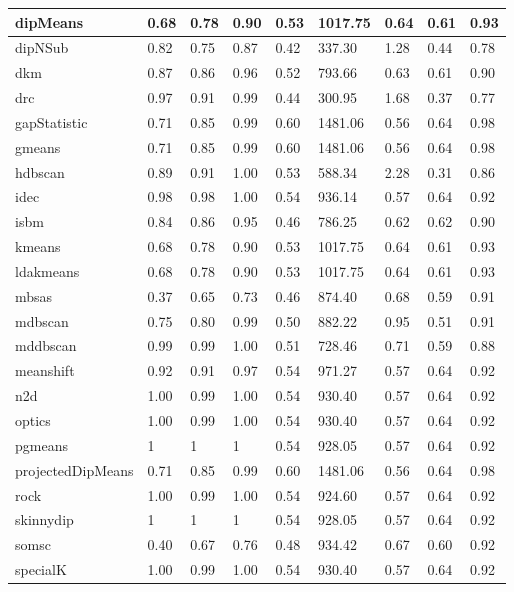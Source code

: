 \begin{table}[H]
\begin{tabular}{|l|l|l|l|l|l|l|l|l|}
\hline
dipMeans & 0.68 & 0.78 & 0.90 & 0.53 & 1017.75 & 0.64 & 0.61 & 0.93 \\
\hline
dipNSub & 0.82 & 0.75 & 0.87 & 0.42 & 337.30 & 1.28 & 0.44 & 0.78 \\
\hline
dkm & 0.87 & 0.86 & 0.96 & 0.52 & 793.66 & 0.63 & 0.61 & 0.90 \\
\hline
drc & 0.97 & 0.91 & 0.99 & 0.44 & 300.95 & 1.68 & 0.37 & 0.77 \\
\hline
gapStatistic & 0.71 & 0.85 & 0.99 & 0.60 & 1481.06 & 0.56 & 0.64 & 0.98 \\
\hline
gmeans & 0.71 & 0.85 & 0.99 & 0.60 & 1481.06 & 0.56 & 0.64 & 0.98 \\
\hline
hdbscan & 0.89 & 0.91 & 1.00 & 0.53 & 588.34 & 2.28 & 0.31 & 0.86 \\
\hline
idec & 0.98 & 0.98 & 1.00 & 0.54 & 936.14 & 0.57 & 0.64 & 0.92 \\
\hline
isbm & 0.84 & 0.86 & 0.95 & 0.46 & 786.25 & 0.62 & 0.62 & 0.90 \\
\hline
kmeans & 0.68 & 0.78 & 0.90 & 0.53 & 1017.75 & 0.64 & 0.61 & 0.93 \\
\hline
ldakmeans & 0.68 & 0.78 & 0.90 & 0.53 & 1017.75 & 0.64 & 0.61 & 0.93 \\
\hline
mbsas & 0.37 & 0.65 & 0.73 & 0.46 & 874.40 & 0.68 & 0.59 & 0.91 \\
\hline
mdbscan & 0.75 & 0.80 & 0.99 & 0.50 & 882.22 & 0.95 & 0.51 & 0.91 \\
\hline
mddbscan & 0.99 & 0.99 & 1.00 & 0.51 & 728.46 & 0.71 & 0.59 & 0.88 \\
\hline
meanshift & 0.92 & 0.91 & 0.97 & 0.54 & 971.27 & 0.57 & 0.64 & 0.92 \\
\hline
n2d & 1.00 & 0.99 & 1.00 & 0.54 & 930.40 & 0.57 & 0.64 & 0.92 \\
\hline
optics & 1.00 & 0.99 & 1.00 & 0.54 & 930.40 & 0.57 & 0.64 & 0.92 \\
\hline
pgmeans & 1 & 1 & 1 & 0.54 & 928.05 & 0.57 & 0.64 & 0.92 \\
\hline
projectedDipMeans & 0.71 & 0.85 & 0.99 & 0.60 & 1481.06 & 0.56 & 0.64 & 0.98 \\
\hline
rock & 1.00 & 0.99 & 1.00 & 0.54 & 924.60 & 0.57 & 0.64 & 0.92 \\
\hline
skinnydip & 1 & 1 & 1 & 0.54 & 928.05 & 0.57 & 0.64 & 0.92 \\
\hline
somsc & 0.40 & 0.67 & 0.76 & 0.48 & 934.42 & 0.67 & 0.60 & 0.92 \\
\hline
specialK & 1.00 & 0.99 & 1.00 & 0.54 & 930.40 & 0.57 & 0.64 & 0.92 \\

\end{tabular}
\end{table}
